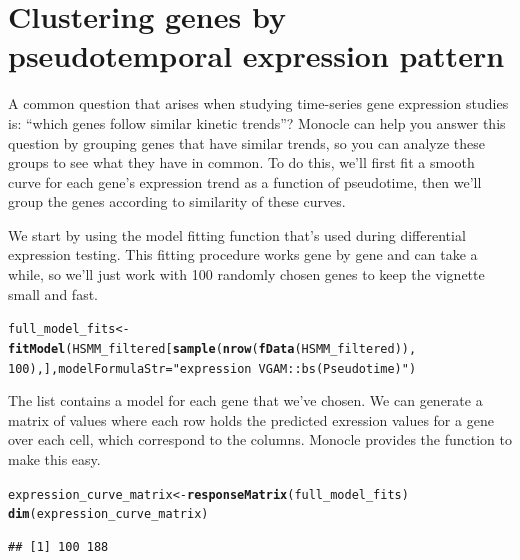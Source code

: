 \documentclass[10pt,oneside]{article}\usepackage[]{graphicx}\usepackage[]{color}
\makeatletter
\newcommand{\hlnum}[1]{\textcolor[rgb]{0.686,0.059,0.569}{#1}}%
\newcommand{\hlstr}[1]{\textcolor[rgb]{0.192,0.494,0.8}{#1}}%
\newcommand{\hlstd}[1]{\textcolor[rgb]{0.345,0.345,0.345}{#1}}%
\newcommand{\hlkwb}[1]{\textcolor[rgb]{0.69,0.353,0.396}{#1}}%
\newcommand{\hlkwc}[1]{\textcolor[rgb]{0.333,0.667,0.333}{#1}}%
\newcommand{\hlkwd}[1]{\textcolor[rgb]{0.737,0.353,0.396}{\textbf{#1}}}%
\newenvironment{kframe}{%
 \def\at@end@of@kframe{}%
 \ifinner\ifhmode%
  \def\at@end@of@kframe{\end{minipage}}%
  \begin{minipage}{\columnwidth}%
 \fi\fi%
 \def\FrameCommand##1{\hskip\@totalleftmargin \hskip-\fboxsep
 \colorbox{shadecolor}{##1}\hskip-\fboxsep
     \hskip-\linewidth \hskip-\@totalleftmargin \hskip\columnwidth}%
 \MakeFramed {\advance\hsize-\width
   \@totalleftmargin\z@ \linewidth\hsize
   \@setminipage}}%
 {\par\unskip\endMakeFramed%
 \at@end@of@kframe}
\newenvironment{knitrout}{}{} %
\makeatother
\begin{document}
\section{Clustering genes by pseudotemporal expression pattern}

A common question that arises when studying time-series gene expression studies is: ``which genes follow similar kinetic trends''?  Monocle can help you answer this question by grouping genes that have similar trends, so you can analyze these groups to see what they have in common.  To do this, we'll first fit a smooth curve for each gene's expression trend as a function of pseudotime, then we'll group the genes according to similarity of these curves. 

We start by using the model fitting function that's used during differential expression testing.  This fitting procedure works gene by gene and can take a while, so we'll just work with 100 randomly chosen genes to keep the vignette small and fast.

\begin{knitrout}
\color{fgcolor}\begin{kframe}
\begin{alltt}
\hlstd{full_model_fits} \hlkwb{<-} \hlkwd{fitModel}\hlstd{(HSMM_filtered[}\hlkwd{sample}\hlstd{(}\hlkwd{nrow}\hlstd{(}\hlkwd{fData}\hlstd{(HSMM_filtered)),}
    \hlnum{100}\hlstd{), ],} \hlkwc{modelFormulaStr} \hlstd{=} \hlstr{"expression~VGAM::bs(Pseudotime)"}\hlstd{)}
\end{alltt}
\end{kframe}
\end{knitrout}


The  list contains a model for each gene that we've chosen.  We can generate a matrix of values where each row holds the predicted exression values for a gene over each cell, which correspond to the columns. Monocle provides the  function to make this easy.

\begin{knitrout}
\color{fgcolor}\begin{kframe}
\begin{alltt}
\hlstd{expression_curve_matrix} \hlkwb{<-} \hlkwd{responseMatrix}\hlstd{(full_model_fits)}
\hlkwd{dim}\hlstd{(expression_curve_matrix)}
\end{alltt}
\begin{verbatim}
## [1] 100 188
\end{verbatim}
\end{kframe}
\end{knitrout}
\end{document}
